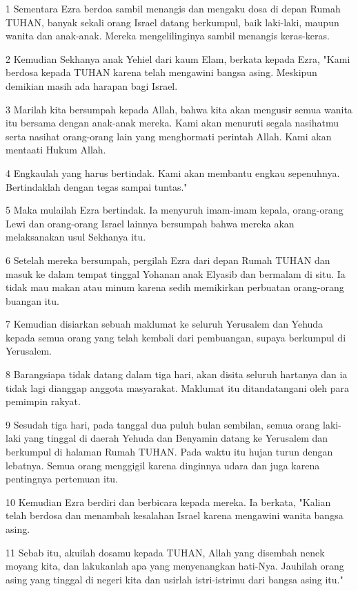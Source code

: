 \par 1 Sementara Ezra berdoa sambil menangis dan mengaku dosa di depan Rumah TUHAN, banyak sekali orang Israel datang berkumpul, baik laki-laki, maupun wanita dan anak-anak. Mereka mengelilinginya sambil menangis keras-keras.
\par 2 Kemudian Sekhanya anak Yehiel dari kaum Elam, berkata kepada Ezra, "Kami berdosa kepada TUHAN karena telah mengawini bangsa asing. Meskipun demikian masih ada harapan bagi Israel.
\par 3 Marilah kita bersumpah kepada Allah, bahwa kita akan mengusir semua wanita itu bersama dengan anak-anak mereka. Kami akan menuruti segala nasihatmu serta nasihat orang-orang lain yang menghormati perintah Allah. Kami akan mentaati Hukum Allah.
\par 4 Engkaulah yang harus bertindak. Kami akan membantu engkau sepenuhnya. Bertindaklah dengan tegas sampai tuntas."
\par 5 Maka mulailah Ezra bertindak. Ia menyuruh imam-imam kepala, orang-orang Lewi dan orang-orang Israel lainnya bersumpah bahwa mereka akan melaksanakan usul Sekhanya itu.
\par 6 Setelah mereka bersumpah, pergilah Ezra dari depan Rumah TUHAN dan masuk ke dalam tempat tinggal Yohanan anak Elyasib dan bermalam di situ. Ia tidak mau makan atau minum karena sedih memikirkan perbuatan orang-orang buangan itu.
\par 7 Kemudian disiarkan sebuah maklumat ke seluruh Yerusalem dan Yehuda kepada semua orang yang telah kembali dari pembuangan, supaya berkumpul di Yerusalem.
\par 8 Barangsiapa tidak datang dalam tiga hari, akan disita seluruh hartanya dan ia tidak lagi dianggap anggota masyarakat. Maklumat itu ditandatangani oleh para pemimpin rakyat.
\par 9 Sesudah tiga hari, pada tanggal dua puluh bulan sembilan, semua orang laki-laki yang tinggal di daerah Yehuda dan Benyamin datang ke Yerusalem dan berkumpul di halaman Rumah TUHAN. Pada waktu itu hujan turun dengan lebatnya. Semua orang menggigil karena dinginnya udara dan juga karena pentingnya pertemuan itu.
\par 10 Kemudian Ezra berdiri dan berbicara kepada mereka. Ia berkata, "Kalian telah berdosa dan menambah kesalahan Israel karena mengawini wanita bangsa asing.
\par 11 Sebab itu, akuilah dosamu kepada TUHAN, Allah yang disembah nenek moyang kita, dan lakukanlah apa yang menyenangkan hati-Nya. Jauhilah orang asing yang tinggal di negeri kita dan usirlah istri-istrimu dari bangsa asing itu."
